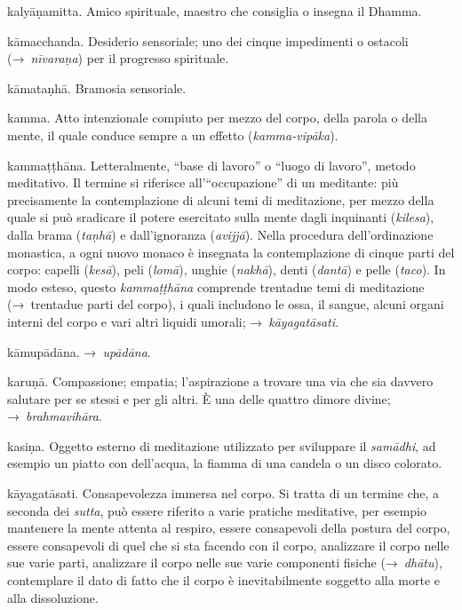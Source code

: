 \begin{glossarydescription}
\item[kalyāṇamitta.] Amico spirituale, maestro che consiglia o insegna il
  Dhamma.

\item[kāmacchanda.] Desiderio sensoriale; uno dei cinque impedimenti o
  ostacoli (→~\emph{nīvaraṇa}) per il progresso spirituale.

\item[kāmataṇhā.] Bramosia sensoriale.

\item[kamma.] Atto intenzionale compiuto per mezzo del corpo, della parola
  o della mente, il quale conduce sempre a un effetto (\emph{kamma-vipāka}).

\item[kammaṭṭhāna.] Letteralmente, ``base di lavoro'' o ``luogo di
  lavoro'', metodo meditativo. Il termine si riferisce all'``occupazione'' di un
  meditante: più precisamente la contemplazione di alcuni temi di meditazione,
  per mezzo della quale si può sradicare il potere esercitato sulla mente dagli
  inquinanti (\emph{kilesa}), dalla brama (\emph{taṇhā}) e dall'ignoranza
  (\emph{avijjā}). Nella procedura dell'ordinazione monastica, a ogni nuovo
  monaco è insegnata la contemplazione di cinque parti del corpo: capelli
  (\emph{kesā}), peli (\emph{lomā}), unghie (\emph{nakhā}), denti (\emph{dantā})
  e pelle (\emph{taco}). In modo esteso, questo \emph{kammaṭṭhāna} comprende
  trentadue temi di meditazione (→~trentadue parti del corpo), i quali includono
  le ossa, il sangue, alcuni organi interni del corpo e vari altri liquidi
  umorali; →~\emph{kāyagatāsati}.

\item[kāmupādāna.] →~\emph{upādāna}.

\item[karuṇā.] Compassione; empatia; l'aspirazione a trovare una via che
  sia davvero salutare per se stessi e per gli altri. È una delle quattro dimore
  divine; →~\emph{brahmavihāra}.

\item[kasiṇa.] Oggetto esterno di meditazione utilizzato per sviluppare il
  \emph{samādhi}, ad esempio un piatto con dell'acqua, la fiamma di una candela
  o un disco colorato.

\item[kāyagatāsati.] Consapevolezza immersa nel corpo. Si tratta di un
  termine che, a seconda dei \emph{sutta}, può essere riferito a varie pratiche
  meditative, per esempio mantenere la mente attenta al respiro, essere
  consapevoli della postura del corpo, essere consapevoli di quel che si sta
  facendo con il corpo, analizzare il corpo nelle sue varie parti, analizzare il
  corpo nelle sue varie componenti fisiche (→~\emph{dhātu}), contemplare il dato
  di fatto che il corpo è inevitabilmente soggetto alla morte e alla
  dissoluzione.


\end{glossarydescription}
